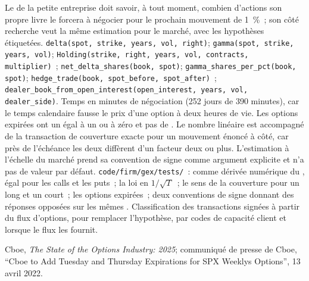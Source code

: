\begin{build}
 Le  de la petite entreprise doit savoir, à tout moment,
combien d'actions son propre livre le forcera à négocier pour le prochain mouvement de 1~\%~;
son côté recherche veut la même estimation pour le marché, avec les
hypothèses étiquetées.
 \texttt{delta(spot, strike, years, vol, right)}; \texttt{gamma(spot, strike, years, vol)}; \texttt{Holding(strike, right,
years, vol, contracts, multiplier)}~; \texttt{net\_delta\_shares(book, spot)}; \texttt{gamma\_shares\_per\_pct(book, spot)}; \texttt{hedge\_trade(book,
spot\_before, spot\_after)}~; \texttt{dealer\_book\_from\_open\_interest(open\_interest, years, vol,
dealer\_side)}.
 Temps en minutes de négociation (252 jours de 390 minutes), car le temps
calendaire fausse le prix d'une option à deux heures de vie. Les options expirées ont un 
égal à un ou à zéro et pas de . Le nombre linéaire est accompagné de la transaction de
couverture exacte pour un mouvement énoncé à côté, car près de l'échéance les deux diffèrent
d'un facteur deux ou plus. L'estimation à l'échelle du marché prend sa convention de signe
comme argument explicite et n'a pas de valeur par défaut.
 \texttt{code/firm/gex/tests/}~:  comme dérivée numérique du
, égal pour les calls et les puts~; la loi en $1/\sqrt T$~; le sens de la couverture pour un
 long et un  court~; les options expirées~; deux conventions de signe donnant des
réponses opposées sur les mêmes .
 Classification des transactions signées à partir du flux d'options,
pour remplacer l'hypothèse, par codes de capacité client et  lorsque le flux
les fournit.
\end{build}

\begin{omsources}
\item Cboe, \emph{The State of the Options Industry: 2025}; communiqué de presse
de Cboe, ``Cboe to Add Tuesday and Thursday Expirations for SPX Weeklys
Options'', 13 avril 2022.
\end{omsources}

